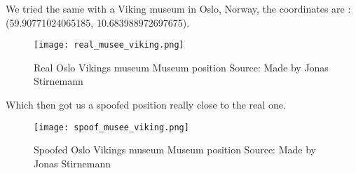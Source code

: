 We tried the same with a Viking museum in Oslo, Norway, the coordinates are : (59.90771024065185, 10.683988972697675).

\begin{figure}[H]
	\centering
	\texttt{[image: real\_musee\_viking.png]}
	\caption[Real Oslo Vikings museum Museum position]{Real Oslo Vikings museum Museum position Source: Made by Jonas Stirnemann}
	\label{fig:viking_real}
\end{figure}

Which then got us a spoofed position really close to the real one.

\begin{figure}[H]
	\centering
	\texttt{[image: spoof\_musee\_viking.png]}
	\caption[Spoofed Oslo Vikings museum Museum position]{Spoofed Oslo Vikings museum Museum position Source: Made by Jonas Stirnemann}
	\label{fig:viking_spoof}
\end{figure}


